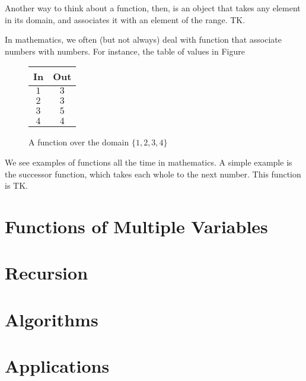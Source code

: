 \documentclass[a4paper,10pt]{report}
\begin{document}
Another way to think about a function, then, is an object that takes any
element in its domain, and associates it with an element of the range. TK.

In mathematics, we often (but not always) deal with function that associate
numbers with numbers. For instance, the table of values in Figure~

\begin{figure}
  \renewcommand{\arraystretch}{1.2}
  \begin{tabular}{|c|c|}
    \hline
    \textbf{In} & \textbf{Out} \\
    \hline
    \(1\) & \(3\) \\
    \(2\) & \(3\) \\
    \(3\) & \(5\) \\
    \(4\) & \(4\) \\
    \hline
  \end{tabular}

  \caption{A function over the domain \(\{1, 2, 3, 4\}\)}
\end{figure}

We see examples of functions all the time in mathematics. A simple example is
the successor function, which takes each whole to the next number. This
function is TK.

\chapter{Functions of Multiple Variables}

\chapter{Recursion}

\chapter{Algorithms}

\chapter{Applications}


\printglossaries

\cleardoublepage
{}
\listoffigures
\end{document}
